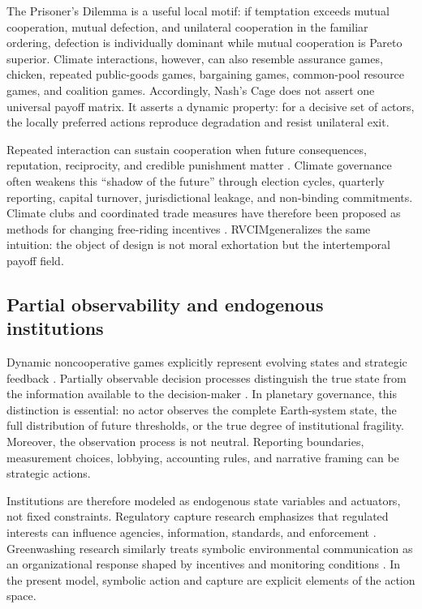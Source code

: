 \documentclass[11pt,a4paper]{article}
\numberwithin{equation}{section}
\theoremstyle{definition}
\theoremstyle{plain}
\theoremstyle{remark}
\newcommand{\RVCIM}{\textsc{RVCIM}}
\begin{document}
The Prisoner's Dilemma is a useful local motif: if temptation exceeds mutual cooperation, mutual defection, and unilateral cooperation in the familiar ordering, defection is individually dominant while mutual cooperation is Pareto superior. Climate interactions, however, can also resemble assurance games, chicken, repeated public-goods games, bargaining games, common-pool resource games, and coalition games. Accordingly, Nash's Cage does not assert one universal payoff matrix. It asserts a dynamic property: for a decisive set of actors, the locally preferred actions reproduce degradation and resist unilateral exit.

Repeated interaction can sustain cooperation when future consequences, reputation, reciprocity, and credible punishment matter \citep{axelrod1984,ostrom1990}. Climate governance often weakens this ``shadow of the future'' through election cycles, quarterly reporting, capital turnover, jurisdictional leakage, and non-binding commitments. Climate clubs and coordinated trade measures have therefore been proposed as methods for changing free-riding incentives \citep{nordhaus2015}. \RVCIM generalizes the same intuition: the object of design is not moral exhortation but the intertemporal payoff field.

\subsection{Partial observability and endogenous institutions}

Dynamic noncooperative games explicitly represent evolving states and strategic feedback \citep{basar1999}. Partially observable decision processes distinguish the true state from the information available to the decision-maker \citep{kaelbling1998}. In planetary governance, this distinction is essential: no actor observes the complete Earth-system state, the full distribution of future thresholds, or the true degree of institutional fragility. Moreover, the observation process is not neutral. Reporting boundaries, measurement choices, lobbying, accounting rules, and narrative framing can be strategic actions.

Institutions are therefore modeled as endogenous state variables and actuators, not fixed constraints. Regulatory capture research emphasizes that regulated interests can influence agencies, information, standards, and enforcement \citep{carpentermoss2014}. Greenwashing research similarly treats symbolic environmental communication as an organizational response shaped by incentives and monitoring conditions \citep{delmasburbano2011}. In the present model, symbolic action and capture are explicit elements of the action space.
\end{document}
